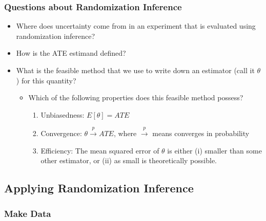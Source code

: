 \documentclass[
]{article}
\providecommand{\tightlist}{%
  \setlength{\itemsep}{0pt}\setlength{\parskip}{0pt}}
\theoremstyle{definition}
\theoremstyle{definition}
\theoremstyle{definition}
\theoremstyle{definition}
\theoremstyle{remark}
\begin{document}
\subsubsection{Questions about Randomization Inference}\label{questions-about-randomization-inference}

\begin{itemize}
\tightlist
\item
  Where does uncertainty come from in an experiment that is evaluated using randomization inference?
\item
  How is the ATE estimand defined?
\item
  What is the feasible method that we use to write down an estimator (call it \(\theta\)) for this quantity?

  \begin{itemize}
  \tightlist
  \item
    Which of the following properties does this feasible method possess?

    \begin{enumerate}
    \def\labelenumi{\alph{enumi}.}
    \tightlist
    \item
      Unbiasedness: \(E[\theta] = ATE\)
    \item
      Convergence: \(\theta \overset{p}\rightarrow ATE\), where \(\overset{p}\rightarrow\) means converges in probability
    \item
      Efficiency: The mean squared error of \(\theta\) is either (i) smaller than some other estimator, or (ii) as small is theoretically possible.
    \end{enumerate}
  \end{itemize}
\end{itemize}

\subsection{Applying Randomization Inference}\label{applying-randomization-inference}

\subsubsection{Make Data}\label{make-data}
\end{document}
